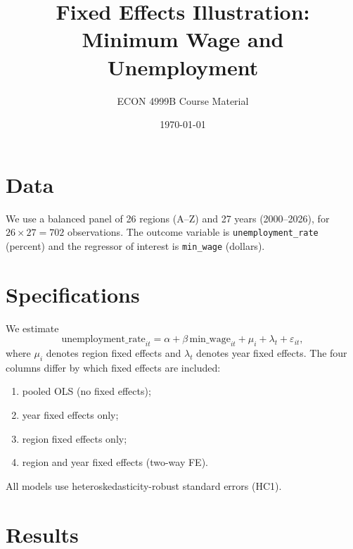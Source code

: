 \documentclass[12pt]{article}
\title{Fixed Effects Illustration:\\Minimum Wage and Unemployment}
\author{ECON 4999B Course Material}
\date{\today}
\begin{document}
\maketitle

\section{Data}

We use a balanced panel of 26 regions (A--Z) and 27 years (2000--2026), for
$26 \times 27 = 702$ observations. The outcome variable is
\texttt{unemployment\_rate} (percent) and the regressor of interest is
\texttt{min\_wage} (dollars).

\section{Specifications}

We estimate
\begin{equation}
    \text{unemployment\_rate}_{it} = \alpha + \beta\,\text{min\_wage}_{it}
    + \mu_i + \lambda_t + \varepsilon_{it},
\end{equation}
where $\mu_i$ denotes region fixed effects and $\lambda_t$ denotes year fixed
effects. The four columns differ by which fixed effects are included:
\begin{enumerate}
    \item[(1)] pooled OLS (no fixed effects);
    \item[(2)] year fixed effects only;
    \item[(3)] region fixed effects only;
    \item[(4)] region and year fixed effects (two-way FE).
\end{enumerate}
All models use heteroskedasticity-robust standard errors (HC1).

\section{Results}
\end{document}
